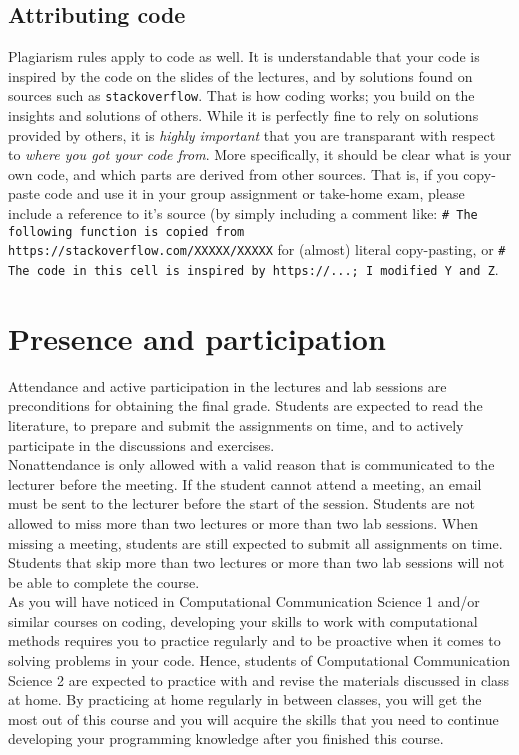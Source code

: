 \documentclass[a4paper,10pt,twocolumn]{report}
\begin{document}
		\subsection{Attributing code}
		Plagiarism rules apply to code as well. It is understandable that your code is inspired by the code on the slides of the lectures, and by solutions found on sources such as \texttt{stackoverflow}. That is how coding works; you build on the insights and solutions of others. While it is perfectly fine to rely on solutions provided by others, it is \emph{highly important} that you are transparant with respect to \emph{where you got your code from}. More specifically, it should be clear what is your own code, and which parts are derived from other sources. That is, if you copy-paste code and use it in your group assignment or take-home exam, please include a reference to it's source (by simply including a comment like: \texttt{\# The following function is copied from https://stackoverflow.com/XXXXX/XXXXX} for (almost) literal copy-pasting, or \texttt{\# The code in this cell is inspired by https://...; I modified Y and Z}. 
	
	\section{Presence and participation}
	Attendance and active participation in the lectures and lab sessions are preconditions for obtaining the final grade. Students are expected to read the literature, to prepare and submit the assignments on time, and to actively participate in the discussions and exercises. \\

	Nonattendance is only allowed with a valid reason that is communicated to the lecturer before the meeting. If the student cannot attend a meeting, an email must be sent to the lecturer before the start of the session. Students are not allowed to miss more than two lectures or more than two lab sessions. When missing a meeting, students are still expected to submit all assignments on time. Students that skip more than two lectures or more than two lab sessions will not be able to complete the course. \\
	
	As you will have noticed in Computational Communication Science 1 and/or similar courses on coding, developing your skills to work with computational methods requires you to practice regularly and to be proactive when it comes to solving problems in your code. Hence, students of Computational Communication Science 2 are expected to practice with and revise the materials discussed in class at home. By practicing at home regularly in between classes, you will get the most out of this course and you will acquire the skills that you need to continue developing your programming knowledge after you finished this course. \\
\end{document}
